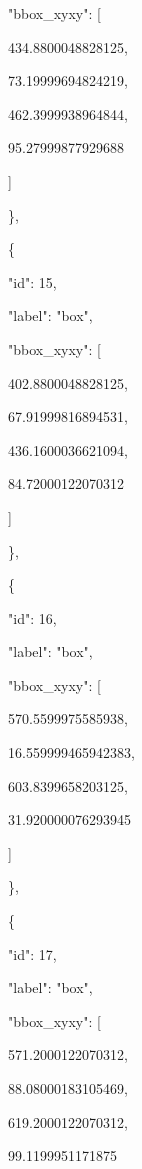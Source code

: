 \documentclass[10pt,a4paper]{article}
\begin{document}
      "bbox\_xyxy":\allowbreak{} [\par
        434.8800048828125,\allowbreak{}\par
        73.19999694824219,\allowbreak{}\par
        462.3999938964844,\allowbreak{}\par
        95.27999877929688\par
      ]\par
    \},\allowbreak{}\par
    \{\par
      "id":\allowbreak{} 15,\allowbreak{}\par
      "label":\allowbreak{} "box",\allowbreak{}\par
      "bbox\_xyxy":\allowbreak{} [\par
        402.8800048828125,\allowbreak{}\par
        67.91999816894531,\allowbreak{}\par
        436.1600036621094,\allowbreak{}\par
        84.72000122070312\par
      ]\par
    \},\allowbreak{}\par
    \{\par
      "id":\allowbreak{} 16,\allowbreak{}\par
      "label":\allowbreak{} "box",\allowbreak{}\par
      "bbox\_xyxy":\allowbreak{} [\par
        570.5599975585938,\allowbreak{}\par
        16.559999465942383,\allowbreak{}\par
        603.8399658203125,\allowbreak{}\par
        31.920000076293945\par
      ]\par
    \},\allowbreak{}\par
    \{\par
      "id":\allowbreak{} 17,\allowbreak{}\par
      "label":\allowbreak{} "box",\allowbreak{}\par
      "bbox\_xyxy":\allowbreak{} [\par
        571.2000122070312,\allowbreak{}\par
        88.08000183105469,\allowbreak{}\par
        619.2000122070312,\allowbreak{}\par
        99.1199951171875\par
\end{document}
